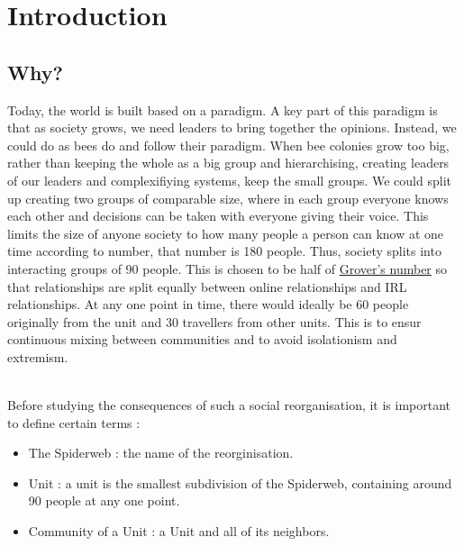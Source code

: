 \chapter{Introduction}
\section{Why? }
Today, the world is built based on a paradigm. A key part of this paradigm is that as society grows, we need leaders to bring together the opinions. Instead, we could do as bees do and follow their paradigm.
When bee colonies grow too big, rather than keeping the whole as a big group and hierarchising, creating leaders of our leaders and complexifiying systems, keep the small groups. We could split up creating two groups of comparable size, where in each group everyone knows each other and decisions can be taken with everyone giving their voice.
This limits the size of anyone society to how many people a person can know at one time according to  number, that number is 180 people. Thus, society splits into interacting groups of 90 people. This is chosen to be half of \underline{Grover's number} so that relationships are split equally between online relationships and IRL relationships. At any one point in time, there would ideally be 60 people originally from the unit and 30 travellers from other units. This is to ensur continuous mixing between communities and to avoid isolationism and extremism.\\ \\

\begin{definition}\label{def:divisions}
    Before studying the consequences of such a social reorganisation, it is important to define certain terms :
    \begin{itemize}
        \item The Spiderweb : the name of the reorginisation.
        \item Unit : a unit is the smallest subdivision of the Spiderweb, containing around 90 people at any one point.
        \item Community of a Unit : a Unit and all of its neighbors.
    \end{itemize}
\end{definition}

